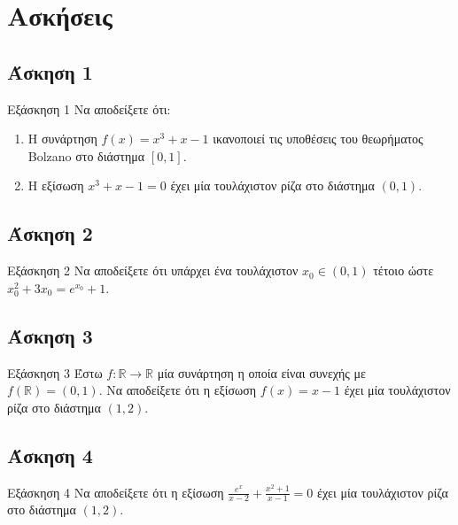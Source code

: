 \documentclass[greek]{beamer}
\begin{document}
\section{Ασκήσεις}
\subsection{Άσκηση 1}
\begin{frame}[label=Άσκηση1]{Εξάσκηση 1}
    Να αποδείξετε ότι:
    \begin{enumerate}
        \item<1-> Η συνάρτηση $f(x)=x^3+x-1$ ικανοποιεί τις υποθέσεις του θεωρήματος Bolzano στο διάστημα $[0,1]$.
        \item<2-> Η εξίσωση $x^3+x-1=0$ έχει μία τουλάχιστον ρίζα στο διάστημα $(0,1)$.
    \end{enumerate}

\end{frame}

\subsection{Άσκηση 2}
\begin{frame}[label=Άσκηση2]{Εξάσκηση 2}
    Να αποδείξετε ότι υπάρχει ένα τουλάχιστον $x_0\in (0,1)$ τέτοιο ώστε $x_0^2+3x_0=e^{x_0}+1$.

\end{frame}

\subsection{Άσκηση 3}
\begin{frame}[label=Άσκηση3]{Εξάσκηση 3}
    Έστω $f:\mathbb{R}\to\mathbb{R}$ μία συνάρτηση η οποία είναι συνεχής με $f(\mathbb{R})=(0,1)$. Να αποδείξετε ότι η εξίσωση $f(x)=x-1$ έχει μία τουλάχιστον ρίζα στο διάστημα $(1,2)$.

\end{frame}

\subsection{Άσκηση 4}
\begin{frame}[label=Άσκηση4]{Εξάσκηση 4}
    Να αποδείξετε ότι η εξίσωση $\frac{e^x}{x-2}+\frac{x^2+1}{x-1}=0$ έχει μία τουλάχιστον ρίζα στο διάστημα $(1,2)$.

\end{frame}
\end{document}
